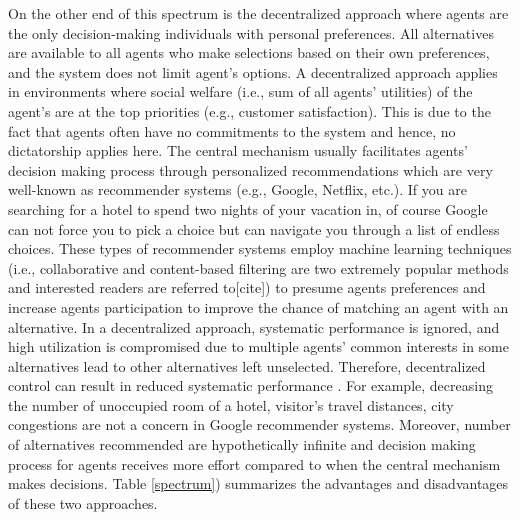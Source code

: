 \documentclass[11pt, letterpaper]{article}
\begin{document}
On the other end of this spectrum is the decentralized approach where agents are the only decision-making individuals with personal preferences. All alternatives are available to all agents who make selections based on their own preferences, and the system does not limit agent's options.  
A decentralized approach applies in environments where social welfare (i.e., sum of all agents' utilities) of the agent's are at the top priorities (e.g., customer satisfaction). This is due to the fact that agents often have no commitments to the system and hence, no dictatorship applies here. The central mechanism usually facilitates agents' decision making process through  personalized recommendations which are very well-known as recommender systems (e.g., Google, Netflix, etc.). If you are searching for a hotel to spend two nights of your vacation in, of course Google can not force you to pick a choice but can navigate you through a list of endless choices. These types of recommender systems employ machine learning techniques (i.e., collaborative and content-based filtering are two extremely popular methods and interested readers are referred to[cite]) to presume agents preferences and increase agents participation to improve the chance of matching an agent with an alternative. In a decentralized approach, systematic performance is ignored, and high utilization is compromised due to multiple agents' common interests in some alternatives lead to other alternatives left unselected. Therefore, decentralized control can result in reduced systematic performance \cite{roughgarden2005selfish}. For example, decreasing the number of unoccupied room of a hotel, visitor's travel distances, city congestions are not a concern in Google recommender systems. Moreover, number of alternatives recommended are hypothetically infinite and decision making process for agents receives more effort compared to when the central mechanism makes decisions. Table \ref{spectrum}) summarizes the advantages and disadvantages of these two approaches.
\end{document}
